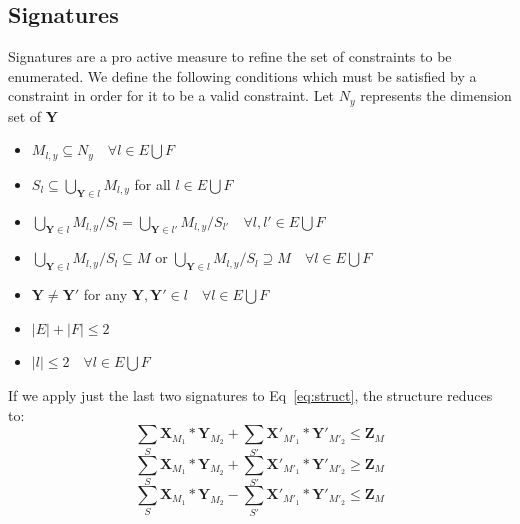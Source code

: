 \documentclass{article}
\newcommand{\TX}{\textbf{X}\xspace}
\newcommand{\TY}{\textbf{Y}\xspace}
\newcommand{\TZ}{\textbf{Z}\xspace}
\begin{document}
\subsection{Signatures}
Signatures are a pro active measure to refine the set of constraints to be enumerated. We define the following conditions which must be satisfied by a constraint in order for it to be a valid constraint. Let $N_y$ represents the dimension set of \TY
\begin{itemize}
            \item $M_{l,y} \subseteq N_y \quad \forall l \in E \bigcup F$
            \item $S_{l} \subseteq \bigcup_{\TY \in l} M_{l,y}$ for all $l \in E \bigcup F$
            \item $\bigcup_{\TY \in l} M_{l,y} / S_{l} = \bigcup_{\TY \in l'} M_{l,y} / S_{l'}\quad \forall l,l' \in E \bigcup F$
            \item $\bigcup_{\TY \in l} M_{l,y} / S_{l} \subseteq M$ or
            $\bigcup_{\TY \in l} M_{l,y} / S_{l} \supseteq M\quad \forall l \in E \bigcup F$
            
            \item $\TY \ne \TY'$ for any $\TY,\TY' \in l \quad \forall l \in E \bigcup F$
            \item $|E|+|F| \le 2$
            \item $|l| \le 2\quad \forall l \in E \bigcup F$
\end{itemize}
If we apply just the last two signatures to Eq~\ref{eq:struct}, the structure reduces to:
\begin{equation}
\label{eq:one}
	\displaystyle\sum_{S} \TX_{M_1} *\TY_{M_2}
	+\sum_{S'} \TX'_{M'_1} *\TY'_{M'_2} \le \TZ_{M}
\end{equation}
\begin{equation}
\label{eq:two}
	\displaystyle\sum_{S} \TX_{M_1} *\TY_{M_2}
	+\sum_{S'} \TX'_{M'_1} *\TY'_{M'_2} \geq \TZ_{M}
\end{equation}
\begin{equation}
\label{eq:three}
	\displaystyle\sum_{S} \TX_{M_1} *\TY_{M_2}
	-\sum_{S'} \TX'_{M'_1} *\TY'_{M'_2} \le \TZ_{M}
\end{equation}
\end{document}

